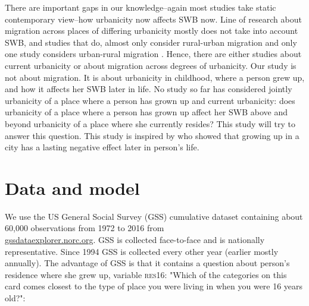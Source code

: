 \documentclass[10pt, letterpaper]{article}
\begin{document}
\begin{spacing}{2.0}
There are important gaps in our knowledge--again most studies take static
contemporary view--how urbanicity now affects SWB now. Line of research about
migration across places of differing urbanicity mostly does not take into
account SWB, and studies that do, almost only consider rural-urban
migration and only one study considers urban-rural migration
\citep{alcock14}. 
%
Hence, there are either studies about current urbanicity or about migration
across degrees of urbanicity.
%
Our study is not about migration. %
It is about urbanicity in
childhood, where a person grew up, and how it affects her SWB later in life. %
No study so far has considered jointly urbanicity of a place where a
person has grown up and current urbanicity: does urbanicity of a place where a
person has
grown up affect her SWB above and beyond urbanicity of a place where she
currently resides?
%
 This study will try to answer this question. 
%
 This study is inspired by \citet{lederbogen11} who
showed that growing up in a city has a lasting negative effect later in person's life.

\section*{Data and model}

We use the US General Social Survey (GSS) cumulative dataset containing about
60,000 observations from 1972 to 2016 from\\ 
\url{gssdataexplorer.norc.org}. GSS is collected face-to-face and is nationally
representative. Since 1994 GSS is collected every other year (earlier mostly annually). 
%
The advantage of GSS is that it contains a question about person's residence
where she grew up,  variable \textsc{res16}: "Which of the categories on this
card comes closest to the type of place you were living in when you were 16
years old?": 



\end{spacing}
\end{document}
